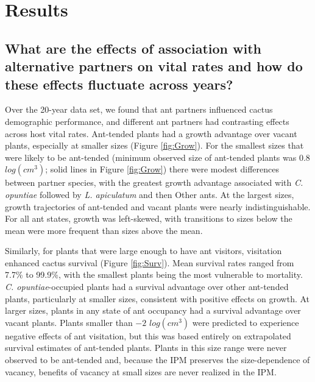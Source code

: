 \documentclass[11pt]{article}
\begin{document}
\section*{Results}
\subsection*{What are the effects of association with alternative partners on vital rates and how do these effects fluctuate across years?}
Over the 20-year data set, we found that ant partners influenced cactus demographic performance, and different ant partners had contrasting effects across host vital rates. 
Ant-tended plants had a growth advantage over vacant plants, especially at smaller sizes (Figure \ref{fig:Grow}).
For the smallest sizes that were likely to be ant-tended (minimum observed size of ant-tended plants was $0.8$ $log(cm^3)$; solid lines in Figure \ref{fig:Grow}) there were modest differences between partner species, with the greatest growth advantage associated with \textit{C. opuntiae} followed by \textit{L. apiculatum} and then Other ants.
At the largest sizes, growth trajectories of ant-tended and vacant plants were nearly indistinguishable. 
For all ant states, growth was left-skewed, with transitions to sizes below the mean were more frequent than sizes above the mean. 

Similarly, for plants that were large enough to have ant visitors, visitation enhanced cactus survival (Figure \ref{fig:Surv}). 
Mean survival rates ranged from 7.7\% to 99.9\%, with the smallest plants being the most vulnerable to mortality. 
\textit{C. opuntiae}-occupied plants had a survival advantage over other ant-tended plants, particularly at smaller sizes, consistent with positive effects on growth. 
At larger sizes, plants in any state of ant occupancy had a survival advantage over vacant plants. 
Plants smaller than $-2$ $log(cm^3)$ were predicted to experience negative effects of ant visitation, but this was based entirely on extrapolated survival estimates of ant-tended plants. 
Plants in this size range were never observed to be ant-tended and, because the IPM preserves the size-dependence of vacancy, benefits of vacancy at small sizes are never realized in the IPM. 
\end{document}
